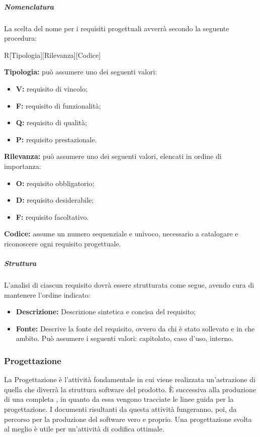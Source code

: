 			\subparagraph{Nomenclatura}
			La scelta del nome per i requisiti progettuali avverrà secondo la seguente procedura:
			\begin{center}
			R[Tipologia][Rilevanza][Codice]
			\end{center}
			\textbf{Tipologia:} può assumere uno dei seguenti valori:
			\begin{itemize}
				\item \textbf{V:} requisito di vincolo;
				\item \textbf{F:} requisito di funzionalità;
				\item \textbf{Q:} requisito di qualità;
				\item \textbf{P:} requisito prestazionale.
			\end{itemize}
			\textbf{Rilevanza:} può assumere uno dei seguenti valori, elencati in ordine di importanza:
			\begin{itemize}
				\item \textbf{O:} requisito obbligatorio;
				\item \textbf{D:} requisito desiderabile;
				\item \textbf{F:} requisito facoltativo.
			\end{itemize}
			\textbf{Codice:} assume un numero sequenziale e univoco, necessario a catalogare e riconoscere ogni requisito progettuale.
		
			\subparagraph{Struttura}
			L'analisi di ciascun requisito dovrà essere strutturata come segue, avendo cura di mantenere l'ordine indicato:
			\begin{itemize}
			  \item \textbf{Descrizione:} Descrizione sintetica e concisa del requisito;
			  \item \textbf{Fonte:} Descrive la fonte del requisito, ovvero da chi è stato sollevato e in che ambito. Può assumere i seguenti valori: capitolato, caso d'uso, interno.
			\end{itemize}
	
	\subsubsection{Progettazione}
	La Progettazione è l'attività fondamentale in cui viene realizzata un'astrazione di quella che diverrà la struttura software del prodotto. \MakeUppercase{è} successiva alla produzione di una completa \AdR, in quanto da essa vengono tracciate le linee guida per la progettazione. I documenti risultanti da questa attività fungeranno, poi, da percorso per la produzione del software vero e proprio. Una progettazione svolta al meglio è utile per un'attività di codifica ottimale.
	
